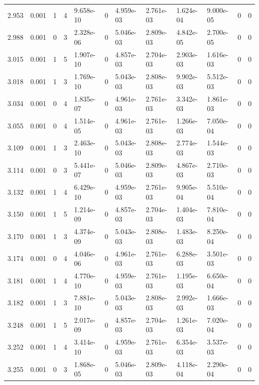 \documentclass[preview]{standalone}
\begin{document}
{{{{\begin{tabular}{L{1.2cm}C{1.2cm} C{0.3cm}C{0.5cm} C{1.4cm}C{1.4cm} C{1.4cm}C{1.4cm} C{1.6cm}C{1.6cm} C{1.6cm}C{1.6cm}}
  2.953  &  0.001  & 1     &  4 &  9.658e-10  & 0  &  4.959e-03&   2.761e-03& 1.624e-04 & 9.000e-05   &  0 & 0  \\ 
  2.988  &  0.001  & 0     &  3 &  2.328e-06  & 0  &  5.046e-03&   2.809e-03& 4.842e-05 & 2.700e-05   &  0 & 0  \\ 
  3.015  &  0.001  & 1     &  5 &  1.907e-10  & 0  &  4.857e-03&   2.704e-03& 2.903e-03 & 1.616e-03   &  0 & 0  \\ 
  3.018  &  0.001  & 1     &  3 &  1.769e-10  & 0  &  5.043e-03&   2.808e-03& 9.902e-03 & 5.512e-03   &  0 & 0  \\ 
  3.034  &  0.001  & 0     &  4 &  1.835e-07  & 0  &  4.961e-03&   2.761e-03& 3.342e-03 & 1.861e-03   &  0 & 0  \\ 
  3.055  &  0.001  & 0     &  4 &  1.514e-05  & 0  &  4.961e-03&   2.761e-03& 1.266e-03 & 7.050e-04   &  0 & 0  \\ 
  3.109  &  0.001  & 1     &  3 &  2.463e-10  & 0  &  5.043e-03&   2.808e-03& 2.774e-03 & 1.544e-03   &  0 & 0  \\ 
  3.114  &  0.001  & 0     &  3 &  5.441e-07  & 0  &  5.046e-03&   2.809e-03& 4.867e-03 & 2.710e-03   &  0 & 0  \\ 
  3.132  &  0.001  & 1     &  4 &  6.429e-10  & 0  &  4.959e-03&   2.761e-03& 9.905e-04 & 5.510e-04   &  0 & 0  \\ 
  3.150  &  0.001  & 1     &  5 &  1.214e-09  & 0  &  4.857e-03&   2.704e-03& 1.404e-03 & 7.810e-04   &  0 & 0  \\ 
  3.170  &  0.001  & 1     &  3 &  4.374e-09  & 0  &  5.043e-03&   2.808e-03& 1.483e-03 & 8.250e-04   &  0 & 0  \\ 
  3.174  &  0.001  & 0     &  4 &  4.046e-06  & 0  &  4.961e-03&   2.761e-03& 6.288e-03 & 3.501e-03   &  0 & 0  \\ 
  3.181  &  0.001  & 1     &  4 &  4.770e-10  & 0  &  4.959e-03&   2.761e-03& 1.195e-03 & 6.650e-04   &  0 & 0  \\ 
  3.182  &  0.001  & 1     &  3 &  7.881e-10  & 0  &  5.043e-03&   2.808e-03& 2.992e-03 & 1.666e-03   &  0 & 0  \\ 
  3.248  &  0.001  & 1     &  5 &  2.017e-09  & 0  &  4.857e-03&   2.704e-03& 1.261e-03 & 7.020e-04   &  0 & 0  \\ 
  3.252  &  0.001  & 1     &  4 &  3.414e-10  & 0  &  4.959e-03&   2.761e-03& 6.354e-03 & 3.537e-03   &  0 & 0  \\ 
  3.255  &  0.001  & 0     &  3 &  1.868e-05  & 0  &  5.046e-03&   2.809e-03& 4.118e-04 & 2.290e-04   &  0 & 0  \\ 

\end{tabular}}}}}
\end{document}

